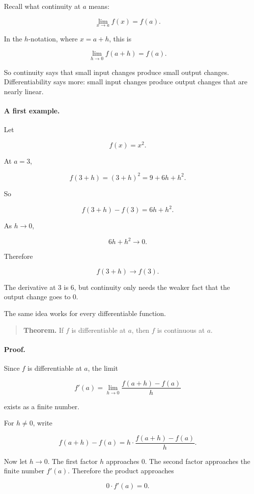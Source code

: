 Recall what continuity at \(a\) means:

\[
\lim_{x\to a}f(x)=f(a).
\]

In the \(h\)-notation, where \(x=a+h\), this is

\[
\lim_{h\to0}f(a+h)=f(a).
\]

So continuity says that small input changes produce small output changes.  Differentiability says more: small input changes produce output changes that are nearly linear.

\paragraph{A first example.}
Let

\[
f(x)=x^2.
\]

At \(a=3\),

\[
f(3+h)=(3+h)^2=9+6h+h^2.
\]

So

\[
f(3+h)-f(3)=6h+h^2.
\]

As \(h\to0\),

\[
6h+h^2\to0.
\]

Therefore

\[
f(3+h)\to f(3).
\]

The derivative at \(3\) is \(6\), but continuity only needs the weaker fact that the output change goes to \(0\).

The same idea works for every differentiable function.

\begin{quote}
\textbf{Theorem.}
If \(f\) is differentiable at \(a\), then \(f\) is continuous at \(a\).
\end{quote}

\paragraph{Proof.}
Since \(f\) is differentiable at \(a\), the limit

\[
f'(a)=\lim_{h\to0}\frac{f(a+h)-f(a)}{h}
\]

exists as a finite number.

For \(h\neq0\), write

\[
f(a+h)-f(a)
=
h\cdot \frac{f(a+h)-f(a)}{h}.
\]

Now let \(h\to0\).  The first factor \(h\) approaches \(0\).  The second factor approaches the finite number \(f'(a)\).  Therefore the product approaches

\[
0\cdot f'(a)=0.
\]

